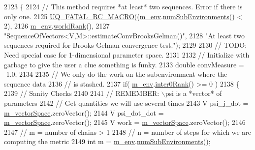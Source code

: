 \begin{DoxyCode}
2123 \{
2124   \textcolor{comment}{// This method requires *at least* two sequences. Error if there is only one.}
2125   \hyperlink{_defines_8h_aa9107e1a9a5197371a412db3fa349988}{UQ\_FATAL\_RC\_MACRO}((\hyperlink{class_q_u_e_s_o_1_1_base_vector_sequence_a8e8824d2a63c5a43bcc6473e3a0491e8}{m\_env}.\hyperlink{class_q_u_e_s_o_1_1_base_environment_ac0345f57e31ef7833e379ed972bd094d}{numSubEnvironments}() < 2),
2126                     \hyperlink{class_q_u_e_s_o_1_1_base_vector_sequence_a8e8824d2a63c5a43bcc6473e3a0491e8}{m\_env}.\hyperlink{class_q_u_e_s_o_1_1_base_environment_a78b57112bbd0e6dd0e8afec00b40ffa7}{worldRank}(),
2127                     \textcolor{stringliteral}{"SequenceOfVectors<V,M>::estimateConvBrooksGelman()"},
2128                     \textcolor{stringliteral}{"At least two sequences required for Brooks-Gelman convergence test."});
2129 
2130   \textcolor{comment}{// TODO: Need special case for 1-dimensional parameter space.}
2131 
2132   \textcolor{comment}{// Initialize with garbage to give the user a clue something is funky.}
2133   \textcolor{keywordtype}{double} convMeasure = -1.0;
2134 
2135   \textcolor{comment}{// We only do the work on the subenvironment where the sequence data}
2136   \textcolor{comment}{// is stashed.}
2137   \textcolor{keywordflow}{if}( \hyperlink{class_q_u_e_s_o_1_1_base_vector_sequence_a8e8824d2a63c5a43bcc6473e3a0491e8}{m\_env}.\hyperlink{class_q_u_e_s_o_1_1_base_environment_ae106b5bb8a80b655b88b3a26b1e7c185}{inter0Rank}() >= 0 )
2138     \{
2139       \textcolor{comment}{// Sanity Checks}
2140       
2141       \textcolor{comment}{// REMEMBER: \(\backslash\)psi is a *vector* of parameters    }
2142       \textcolor{comment}{// Get quantities we will use several times}
2143       V psi\_j\_dot = \hyperlink{class_q_u_e_s_o_1_1_base_vector_sequence_a4bd171e39ed050ff105c808336f35198}{m\_vectorSpace}.zeroVector();
2144       V psi\_dot\_dot = \hyperlink{class_q_u_e_s_o_1_1_base_vector_sequence_a4bd171e39ed050ff105c808336f35198}{m\_vectorSpace}.zeroVector();
2145       V work = \hyperlink{class_q_u_e_s_o_1_1_base_vector_sequence_a4bd171e39ed050ff105c808336f35198}{m\_vectorSpace}.zeroVector();
2146 
2147       \textcolor{comment}{// m = number of chains > 1}
2148       \textcolor{comment}{// n = number of steps for which we are computing the metric}
2149       \textcolor{keywordtype}{int} m = \hyperlink{class_q_u_e_s_o_1_1_base_vector_sequence_a8e8824d2a63c5a43bcc6473e3a0491e8}{m\_env}.\hyperlink{class_q_u_e_s_o_1_1_base_environment_ac0345f57e31ef7833e379ed972bd094d}{numSubEnvironments}();

\end{DoxyCode}
